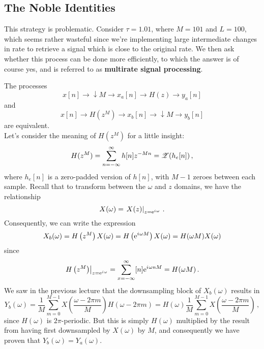 \subsection{The Noble Identities}
%
This strategy is problematic. Consider $\tau = 1.01$, where $M = 101$ and
$L = 100$, which seems rather wasteful since we're implementing large intermediate
changes in rate to retrieve a signal which is close to the original rate. We then
ask whether this process can be done more efficiently, to which the answer is of
course yes, and is referred to as \textbf{multirate signal processing}.
%
\begin{iden}
  The processes
  \begin{displaymath}
    x[n] \longrightarrow \boxed{\downarrow M} \longrightarrow x_a[n]
    \longrightarrow \boxed{H(z)} \longrightarrow y_a[n]
  \end{displaymath}
  and
  \begin{displaymath}
    x[n] \longrightarrow \boxed{H\left(z^M\right)} \longrightarrow x_b[n]
    \longrightarrow \boxed{\downarrow M} \longrightarrow y_b[n]
  \end{displaymath}
  are equivalent.\\

  Let's consider the meaning of $H(z^M)$ for a little insight:
  \begin{displaymath}
    H(z^M) = \sum_{n=-\infty}^\infty h[n]z^{-Mn} = \mathscr{Z}(h_e[n]) \,,
  \end{displaymath}
  where $h_e[n]$ is a zero-padded version of $h[n]$, with $M-1$ zeroes between
  each sample. Recall that to transform between the $\omega$ and $z$ domains,
  we have the relationship
  \begin{displaymath}
    X(\omega) = \left. X(z) \right|_{z = \mathrm{e}^{{i\mkern1mu}\omega}} \,.
  \end{displaymath}
  Consequently, we can write the expression
  \begin{displaymath}
    X_b(\omega) = H\left(z^M\right)X(\omega) = H\left(\mathrm{e}^{{i\mkern1mu}\omega M}\right)X(\omega)
    = H(\omega M) X(\omega)
  \end{displaymath}
  since
  \begin{displaymath}
    \left.H\left(z^M\right)\right|_{z=\mathrm{e}^{{i\mkern1mu}\omega}}
    = \sum_{x=-\infty}^\infty[n]\mathrm{e}^{{i\mkern1mu}\omega nM} = H(\omega M) \,.
  \end{displaymath}
  We saw in the previous lecture that the downsampling block of $X_b(\omega)$ results in
  \begin{displaymath}
    Y_b(\omega) = \frac{1}{M}\sum_{m=0}^{M-1}X\left(\frac{\omega - 2\pi m}{M}\right)
    H(\omega - 2\pi m)
    = H(\omega)\frac{1}{M}\sum_{m=0}^{M-1} X\left(\frac{\omega - 2\pi m}{M}\right) \,,
  \end{displaymath}
  since $H(\omega)$ is $2\pi$-periodic. But this is simply $H(\omega)$ multiplied by
  the result from having first downsampled by $X(\omega)$ by $M$, and consequently we
  have proven that $Y_b(\omega) = Y_a(\omega)$.
\end{iden}
